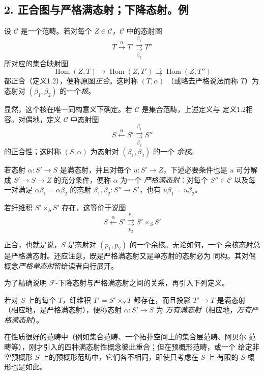\subsection*{2. 正合图与严格满态射；下降态射。例}

 设 $\mathcal C$ 是一个范畴。若对每个
$Z\in\mathcal C$，$\mathcal C$ 中的态射图
\[
  T\xrightarrow{\alpha}T'
  \overset{\beta_1}{\underset{\beta_2}{\rightrightarrows}}T''
\]
所对应的集合映射图
\[
  \operatorname{Hom}(Z,T)\longrightarrow
  \operatorname{Hom}(Z,T')
  \rightrightarrows\operatorname{Hom}(Z,T'')
\]
都正合（定义1.2），便称原图\emph{正合}。这时称 $(T,\alpha)$
（或略去严格说法而称 $T$）为态射对 $(\beta_1,\beta_2)$ 的一个\emph{核}。

显然，这个核在唯一同构意义下确定。若 $\mathcal C$ 是集合范畴，上述定义与
定义1.2相容。对偶地，定义 $\mathcal C$ 中态射图
\[
  S\xleftarrow{\alpha}S'
  \overset{\beta_1}{\underset{\beta_2}{\rightrightarrows}}S''
\]
的正合性；这时称 $(S,\alpha)$ 为态射对 $(\beta_1,\beta_2)$ 的一个
\emph{余核}。

 若态射 $\alpha:S'\longrightarrow S$ 是满态射，并且对每个
$u:S'\longrightarrow Z$，下述必要条件也是 $u$ 可分解成
$S'\longrightarrow S\longrightarrow Z$ 的充分条件，便称 $\alpha$ 为一个
\emph{严格满态射}：对每个 $S''\in\mathcal C$ 以及每一对满足
$\alpha\beta_1=\alpha\beta_2$ 的态射
$\beta_1,\beta_2:S''\longrightarrow S'$，也有 $u\beta_1=u\beta_2$。

若纤维积 $S'\times_S S'$ 存在，这等价于说图
\[
  S\xleftarrow{\alpha}S'
  \overset{p_1}{\underset{p_2}{\rightrightarrows}}S'\times_S S'
\]

正合，也就是说，$S$ 是态射对 $(p_1,p_2)$ 的一个余核。无论如何，一个
余核态射总是严格满态射。还应注意，既是严格满态射又是单态射的态射必为
同构。其对偶概念\emph{严格单态射}留给读者自行展开。

为了精确说明 $\mathcal F$-下降态射与严格满态射之间的关系，再引入下列定义。

 若对 $S$ 上的每个 $T$，纤维积
$T'=S'\times_ST$ 都存在，而且投影 $T'\longrightarrow T$ 是满态射
（相应地，是严格满态射），便称态射 $\alpha:S'\longrightarrow S$ 为
\emph{万有满态射}（相应地，\emph{万有严格满态射}）。

在性质很好的范畴中（例如集合范畴、一个拓扑空间上的集合层范畴、阿贝尔
范畴等），刚才引入的四种满态射性概念彼此重合；但在预概形范畴，或一个
给定非空预概形 $S$ 上的预概形范畴中，它们各不相同，即使只考虑在 $S$ 上
有限的 $S$-概形也是如此。

